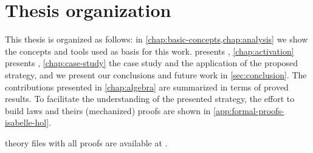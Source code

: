 \section{Thesis organization}

This thesis is organized as follows: in \cref{chap:basic-concepts,chap:analysis} we show the concepts and tools used as basis for this work.
 presents , \cref{chap:activation} presents , \cref{chap:case-study} the case study and the application of the proposed strategy, and we present our conclusions and future work in \cref{sec:conclusion}.
The contributions presented in \cref{chap:algebra} are summarized in terms of proved results.
To facilitate the understanding of the presented strategy, the effort to build laws and theirs (mechanized) proofs are shown in \cref{app:formal-proofs-isabelle-hol}.

 theory files with all proofs are available at \algebraurl.